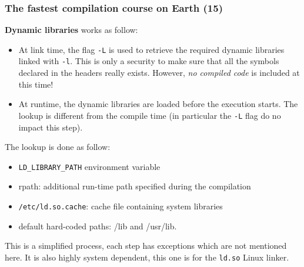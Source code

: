 \documentclass[hyperref={pdfpagelabels=false}]{beamer}
\begin{document}
\begin{frame}[fragile]
\frametitle{The fastest compilation course on Earth (15)}

\textbf{Dynamic libraries} works as follow:

\begin{itemize}
\item At link time, the flag \texttt{-L} is used to retrieve the
  required dynamic libraries linked with \texttt{-l}. This is only a
  security to make sure that all the symbols declared in the headers
  really exists. However, \textit{no compiled code} is included at
  this time!
\item At runtime, the dynamic libraries are loaded before the
  execution starts. The lookup is different from the compile time (in
  particular the \texttt{-L} flag do no impact this step).
\end{itemize}

The lookup is done as follow:
\begin{itemize}
  \item \texttt{LD\_LIBRARY\_PATH} environment variable
  \item rpath: additional run-time path specified during the compilation
  \item \texttt{/etc/ld.so.cache}: cache file containing system libraries
  \item default hard-coded paths: /lib and /usr/lib.
\end{itemize}

This is a simplified process, each step has exceptions which are not
mentioned here. It is also highly system dependent, this one is for
the \texttt{ld.so} Linux linker.
\end{frame}
\end{document}
